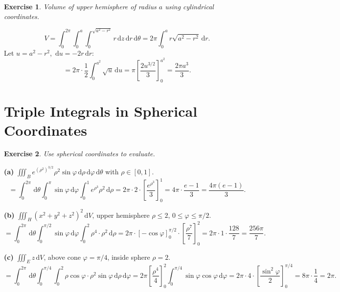 \documentclass[12pt,a4paper]{article}
\theoremstyle{exstyle}
\newtheorem{exercise}{Exercise}[section]
\newcommand{\dif}[1]{\,\mathrm{d}#1}
\begin{document}
\begin{exercise}
Volume of upper hemisphere of radius $a$ using cylindrical coordinates.
\end{exercise}
\begin{solbox}
\[
  V=\int_0^{2\pi}\!\int_0^a\!\int_0^{\sqrt{a^2-r^2}}r\dif{z}\dif{r}\dif{\theta}
  =2\pi\int_0^a r\sqrt{a^2-r^2}\dif{r}.
\]
Let $u=a^2-r^2$, $\dif{u}=-2r\dif{r}$:
\[
  =2\pi\cdot\frac{1}{2}\int_0^{a^2}\sqrt{u}\dif{u}=\pi\!\left[\frac{2u^{3/2}}{3}\right]_0^{a^2}=\frac{2\pi a^3}{3}.
\]
\end{solbox}

\section{Triple Integrals in Spherical Coordinates}

\begin{exercise}
Use spherical coordinates to evaluate.
\end{exercise}
\begin{solbox}
\textbf{(a)} $\iiint_B e^{(\rho^2)^{3/2}}\rho^2\sin\varphi\dif{\rho}\dif{\varphi}\dif{\theta}$
with $\rho\in[0,1]$.
\[
  =\int_0^{2\pi}\dif\theta\int_0^\pi\sin\varphi\dif\varphi\int_0^1 e^{\rho^3}\rho^2\dif\rho
  =2\pi\cdot2\cdot\left[\frac{e^{\rho^3}}{3}\right]_0^1=4\pi\cdot\frac{e-1}{3}=\frac{4\pi(e-1)}{3}.
\]

\textbf{(b)} $\iiint_H(x^2+y^2+z^2)^2\dif{V}$, upper hemisphere $\rho\le2$, $0\le\varphi\le\pi/2$.
\[
  =\int_0^{2\pi}\dif\theta\int_0^{\pi/2}\sin\varphi\dif\varphi\int_0^2\rho^4\cdot\rho^2\dif\rho
  =2\pi\cdot[-\cos\varphi]_0^{\pi/2}\cdot\left[\frac{\rho^7}{7}\right]_0^2
  =2\pi\cdot1\cdot\frac{128}{7}=\frac{256\pi}{7}.
\]

\textbf{(c)} $\iiint_E z\dif{V}$, above cone $\varphi=\pi/4$, inside sphere $\rho=2$.
\[
  =\int_0^{2\pi}\dif\theta\int_0^{\pi/4}\int_0^2\rho\cos\varphi\cdot\rho^2\sin\varphi\dif\rho\dif\varphi
  =2\pi\left[\frac{\rho^4}{4}\right]_0^2\int_0^{\pi/4}\sin\varphi\cos\varphi\dif\varphi
  =2\pi\cdot4\cdot\left[\frac{\sin^2\!\varphi}{2}\right]_0^{\pi/4}
  =8\pi\cdot\frac{1}{4}=2\pi.
\]
\end{solbox}
\end{document}
